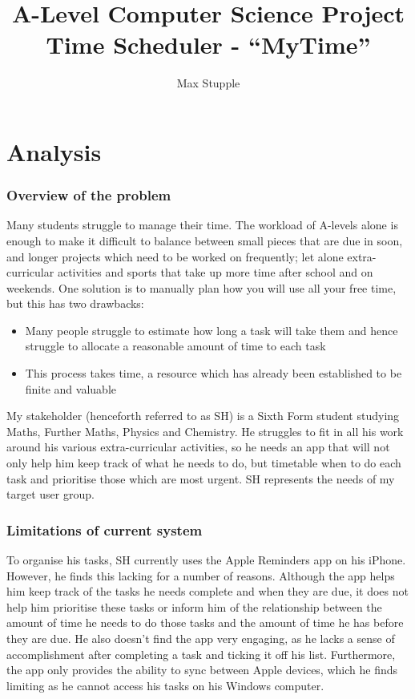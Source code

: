 \documentclass{article}
\title{A-Level Computer Science Project\\ Time Scheduler - ``MyTime''}
\author{Max Stupple}
\date{}
\begin{document}
\maketitle

\tableofcontents

\part{Analysis}
\section{Overview of the problem}
Many students struggle to manage their time. The workload of A-levels alone is
enough to make it difficult to balance between small pieces that are due in
soon, and longer projects which need to be worked on frequently; let
alone extra-curricular activities and sports that take up more time after school
and on weekends. One solution is to manually plan how you will use all your free
time, but this has two drawbacks:

\begin{samepage}
	\begin{itemize}
		\item Many people struggle to estimate how long a task will take them and hence
		      struggle to allocate a reasonable amount of time to each task
		\item This process takes time, a resource which has already been established to
		      be finite and valuable
	\end{itemize}
\end{samepage}

My stakeholder (henceforth referred to as SH) is a Sixth Form student
studying Maths, Further Maths, Physics and Chemistry. He struggles to fit in all
his work around his various extra-curricular activities, so he needs an app that
will not only help him keep track of what he needs to do, but timetable when to do each task and prioritise those which are most urgent. SH represents the needs
of my target user group.

\section{Limitations of current system}
To organise his tasks, SH currently uses the Apple Reminders app on his iPhone.
However, he finds this lacking for a number of reasons. Although the app helps
him keep track of the tasks he needs complete and when they are due, it does not
help him prioritise these tasks or inform him of the relationship between the
amount of time he needs to do those tasks and the amount of time he has before
they are due. He also doesn't find the app very engaging, as he lacks a sense of
accomplishment after completing a task and ticking it off his list. Furthermore,
the app only provides the ability to sync between Apple devices, which he finds
limiting as he cannot access his tasks on his Windows computer.
\end{document}
